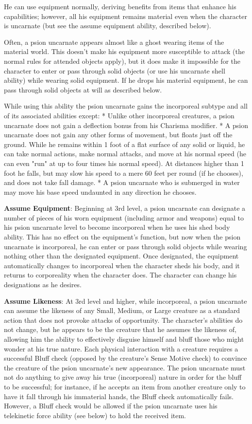 He can use equipment normally, deriving benefits from items that enhance his capabilities; however, all his equipment remains material even when the character is uncarnate (but see the assume equipment ability, described below).

Often, a psion uncarnate appears almost like a ghost wearing items of the material world. This doesn't make his equipment more susceptible to attack (the normal rules for attended objects apply), but it does make it impossible for the character to enter or pass through solid objects (or use his uncarnate shell ability) while wearing solid equipment. If he drops his material equipment, he can pass through solid objects at will as described below.

While using this ability the psion uncarnate gains the incorporeal subtype and all of its associated abilities except:
* Unlike other incorporeal creatures, a psion uncarnate does not gain a deflection bonus from his Charisma modifier.
* A psion uncarnate does not gain any other forms of movement, but floats just off the ground. While he remains within 1 foot of a flat surface of any solid or liquid, he can take normal actions, make normal attacks, and move at his normal speed (he can even "run" at up to four times his normal speed). At distances higher than 1 foot he falls, but may slow his speed to a mere 60 feet per round (if he chooses), and does not take fall damage.
* A psion uncarnate who is submerged in water may move his base speed undaunted in any direction he chooses.

\textbf{Assume Equipment}: Beginning at 3rd level, a psion uncarnate can designate a number of pieces of his worn equipment (including armor and weapons) equal to his psion uncarnate level to become incorporeal when he uses his shed body ability. This has no effect on the equipment's function, but now when the psion uncarnate is incorporeal, he can enter or pass through solid objects while wearing nothing other than the designated equipment. Once designated, the equipment automatically changes to incorporeal when the character sheds his body, and it returns to corporeality when the character does. The character can change his designations as he desires.

\textbf{Assume Likeness}: At 3rd level and higher, while incorporeal, a psion uncarnate can assume the likeness of any Small, Medium, or Large creature as a standard action that does not provoke attacks of opportunity. The character's abilities do not change, but he appears to be the creature that he assumes the likeness of, allowing him the ability to effectively disguise himself and bluff those who might wonder at his true nature. Each physical interaction with a creature requires a successful Bluff check (opposed by the creature's Sense Motive check) to convince the creature of the psion uncarnate's new appearance. The psion uncarnate must not do anything to give away his true (incorporeal) nature in order for the bluff to be successful; for instance, if he accepts an item from another creature only to have it fall through his immaterial hands, the Bluff check automatically fails. However, a Bluff check would be allowed if the psion uncarnate uses his telekinetic force ability (see below) to hold the received item.

